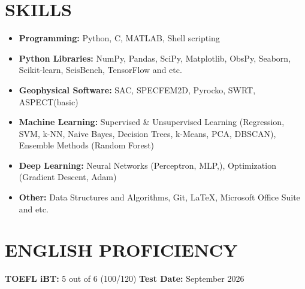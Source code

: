 \documentclass[a4paper,9pt]{extarticle}
\begin{document}
\section*{SKILLS}
\begin{itemize}
    \item \textbf{Programming:} Python, C, MATLAB, Shell scripting
    \item \textbf{Python Libraries:} NumPy, Pandas, SciPy, Matplotlib, ObsPy, Seaborn, Scikit-learn, SeisBench, TensorFlow and etc.
    \item \textbf{Geophysical Software:} SAC, SPECFEM2D, Pyrocko, SWRT, ASPECT(basic)
    \item \textbf{Machine Learning:} Supervised \& Unsupervised Learning (Regression, SVM, k-NN, Naive Bayes, Decision 
    Trees, k-Means, PCA, DBSCAN), 
    Ensemble Methods (Random Forest)
    \item \textbf{Deep Learning:} Neural Networks (Perceptron, MLP,), Optimization (Gradient Descent, Adam)
    \item \textbf{Other:} Data Structures and Algorithms, Git, LaTeX, Microsoft Office Suite and etc.
\end{itemize}



\section*{ENGLISH PROFICIENCY}

\noindent
\textbf{TOEFL iBT:} 5 out of 6 (100/120) \hfill \textbf{Test Date:} September 2026
\end{document}
